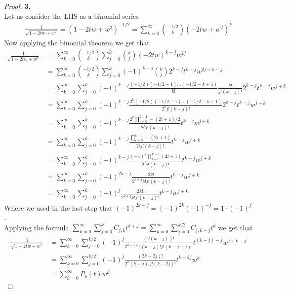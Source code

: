 \documentclass[11pt]{article}
\theoremstyle{definition}
\begin{document}
\cleardoublepage
\begin{proof}{\textbf{3.}}\\
Let us consider the LHS as a binomial series
\begin{align*}
    \frac{1}{\sqrt{1 - 2tw + w^2}}
    = (1 - 2tw + w^2)^{-1/2}
    = \sum_{k = 0}^\infty \binom{-1/2}{k} (- 2tw + w^2)^k
\end{align*}
Now applying the binomial theorem we get that
\begin{align*}
    \frac{1}{\sqrt{1 - 2tw + w^2}}
    &= \sum_{k = 0}^\infty \binom{-1/2}{k} \sum_{j = 0}^k \binom{k}{j}(- 2tw)^{k-j} w^{2j}\\
    &= \sum_{k = 0}^\infty \binom{-1/2}{k}
    \sum_{j = 0}^k (-1)^{k-j}\binom{k}{j}2^{k-j} t^{k-j} w^{2j + k - j}\\
    &= \sum_{k = 0}^\infty \sum_{j = 0}^k
    (-1)^{k-j}\frac{(-1/2) (-1/2 - 1) ... (-1/2 - k + 1)}{k!}
    \frac{k!}{j!(k - j)!}2^{k-j} t^{k-j} w^{j + k}\\
    &= \sum_{k = 0}^\infty \sum_{j = 0}^k
    (-1)^{k-j}\frac{2^k(-1/2) (-1/2 - 1) ... (-1/2 - k + 1)}{2^kj!(k - j)!}
    2^{k-j} t^{k-j} w^{j + k}\\
    &= \sum_{k = 0}^\infty \sum_{j = 0}^k
    (-1)^{k-j}\frac{2^k\prod_{i=0}^{k-1} -(2i + 1)/2}{2^j j!(k - j)!}
    t^{k-j} w^{j + k}\\
    &= \sum_{k = 0}^\infty \sum_{j = 0}^k
    (-1)^{k-j}\frac{\prod_{i=0}^{k-1} -(2i + 1)}{2^j j!(k - j)!}
    t^{k-j} w^{j + k}\\
    &= \sum_{k = 0}^\infty \sum_{j = 0}^k
    (-1)^{k-j}\frac{(-1)^{k}\prod_{i=0}^{k-1}(2i + 1)}{2^j j!(k - j)!}
    t^{k-j} w^{j + k}\\
    &= \sum_{k = 0}^\infty \sum_{j = 0}^k
    (-1)^{2k-j}\frac{2k !}{2^{k+ j} k! j!(k - j)!}
    t^{k-j} w^{j + k}\\
    &= \sum_{k = 0}^\infty \sum_{j = 0}^k
    (-1)^{j}\frac{2k !}{2^{k+ j} k! j!(k - j)!}
    t^{k-j} w^{j + k}
\end{align*}
Where we used in the last step that $(-1)^{2k -j} = (-1)^{2k}(-1)^{-j}
= 1 \cdot (-1)^{j}$.\\
Applying the formula $\sum_{k=0}^\infty \sum_{j=0}^k C_{j,k}t^{k+j}
= \sum_{k=0}^\infty \sum_{j=0}^{k/2} C_{j, k-j}t^{k}$ we get that
\begin{align*}
    \frac{1}{\sqrt{1 - 2tw + w^2}}
    &= \sum_{k = 0}^\infty \sum_{j = 0}^{k/2}
    (-1)^{j}\frac{(2(k -j))!}{2^{k - j+ j} (k-j)! j!(k - j - j)!}
    t^{(k - j) - j} w^{j + k - j}\\
    &= \sum_{k = 0}^\infty \sum_{j = 0}^{k/2}
    (-1)^{j}\frac{(2k - 2j)!}{2^{k} (k-j)! j!(k - 2j)!}
    t^{k -2j} w^{k}\\
    &= \sum_{k = 0}^\infty P_k(t) w^{k}
\end{align*}
\end{proof}
\end{document}
